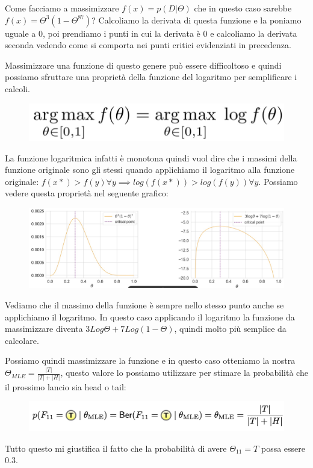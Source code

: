 \documentclass[14pt]{extreport}
\begin{document}
Come facciamo a massimizzare $f(x) = p(D|\Theta)$ che in questo caso sarebbe $f(x) = \Theta^3(1-\Theta^87)$? Calcoliamo la derivata di questa funzione
e la poniamo uguale a 0, poi prendiamo i punti in cui la derivata è 0 e calcoliamo la derivata seconda vedendo come si comporta nei punti critici
evidenziati in precedenza.

Massimizzare una funzione di questo genere può essere difficoltoso e quindi possiamo sfruttare una proprietà della funzione del logaritmo per
semplificare i calcoli. 
\begin{figure}[H]
\centering
  \includegraphics[width=0.5\linewidth]{23.jpeg}
\end{figure}
La funzione logaritmica infatti è monotona quindi vuol dire che i massimi della funzione originale sono gli stessi quando applichiamo il logaritmo
alla funzione originale: $f(x*) > f(y) \forall y \implies log(f(x*))> log(f(y))  \forall y $. Possiamo vedere questa proprietà nel seguente grafico:
\begin{figure}[H]
\centering
  \includegraphics[width=\linewidth]{22.jpeg}
\end{figure}

Vediamo che il massimo della funzione è sempre nello stesso punto anche se applichiamo il logaritmo. In questo caso applicando il logaritmo la
funzione da massimizzare diventa $3Log\Theta + 7Log(1-\Theta)$, quindi molto più semplice da calcolare.

Possiamo quindi massimizzare la funzione e in questo caso otteniamo la nostra $\Theta_{MLE} = \frac{|T|}{|T|+|H|}$, questo valore lo possiamo
utilizzare per stimare la probabilità che il prossimo lancio sia head o tail:
\begin{figure}[H]
\centering
\includegraphics[width=0.7\linewidth]{24.jpeg}
\end{figure}
Tutto questo mi giustifica il fatto che la probabilità di avere $\Theta_{11} = T$ possa essere 0.3.
\end{document}
